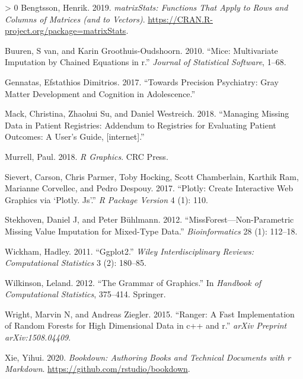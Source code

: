 \documentclass[
]{book}
\newlength{\cslhangindent}
\newenvironment{CSLReferences}[3] %
 {%
  \setlength{\parindent}{0pt}
  \ifodd #1 \everypar{\setlength{\hangindent}{\cslhangindent}}\ignorespaces\fi
  \ifnum #2 > 0
  \setlength{\parskip}{#2\baselineskip}
  \fi
 }%
 {}
\begin{document}
\hypertarget{refs}{}
\begin{CSLReferences}{1}{0}
\leavevmode\hypertarget{ref-matrixStats2019}{}%
Bengtsson, Henrik. 2019. \emph{matrixStats: Functions That Apply to Rows and Columns of Matrices (and to Vectors)}. \url{https://CRAN.R-project.org/package=matrixStats}.

\leavevmode\hypertarget{ref-buuren2010mice}{}%
Buuren, S van, and Karin Groothuis-Oudshoorn. 2010. {``Mice: Multivariate Imputation by Chained Equations in r.''} \emph{Journal of Statistical Software}, 1--68.

\leavevmode\hypertarget{ref-gennatas2017towards}{}%
Gennatas, Efstathios Dimitrios. 2017. {``Towards Precision Psychiatry: Gray Matter Development and Cognition in Adolescence.''}

\leavevmode\hypertarget{ref-mack2018managing}{}%
Mack, Christina, Zhaohui Su, and Daniel Westreich. 2018. {``Managing Missing Data in Patient Registries: Addendum to Registries for Evaluating Patient Outcomes: A User's Guide, {[}internet{]}.''}

\leavevmode\hypertarget{ref-murrell2018r}{}%
Murrell, Paul. 2018. \emph{R Graphics}. CRC Press.

\leavevmode\hypertarget{ref-sievert2017plotly}{}%
Sievert, Carson, Chris Parmer, Toby Hocking, Scott Chamberlain, Karthik Ram, Marianne Corvellec, and Pedro Despouy. 2017. {``Plotly: Create Interactive Web Graphics via {`Plotly. Js'}.''} \emph{R Package Version} 4 (1): 110.

\leavevmode\hypertarget{ref-stekhoven2012missforest}{}%
Stekhoven, Daniel J, and Peter Bühlmann. 2012. {``MissForest---Non-Parametric Missing Value Imputation for Mixed-Type Data.''} \emph{Bioinformatics} 28 (1): 112--18.

\leavevmode\hypertarget{ref-wickham2011ggplot2}{}%
Wickham, Hadley. 2011. {``Ggplot2.''} \emph{Wiley Interdisciplinary Reviews: Computational Statistics} 3 (2): 180--85.

\leavevmode\hypertarget{ref-wilkinson2012grammar}{}%
Wilkinson, Leland. 2012. {``The Grammar of Graphics.''} In \emph{Handbook of Computational Statistics}, 375--414. Springer.

\leavevmode\hypertarget{ref-wright2015ranger}{}%
Wright, Marvin N, and Andreas Ziegler. 2015. {``Ranger: A Fast Implementation of Random Forests for High Dimensional Data in c++ and r.''} \emph{arXiv Preprint arXiv:1508.04409}.

\leavevmode\hypertarget{ref-R-bookdown}{}%
Xie, Yihui. 2020. \emph{Bookdown: Authoring Books and Technical Documents with r Markdown}. \url{https://github.com/rstudio/bookdown}.

\end{CSLReferences}

\backmatter

\let\hyperlink=\oldhyperlink %
\cleardoublepage
{}

\printindex


\printindex[code]
\end{document}
